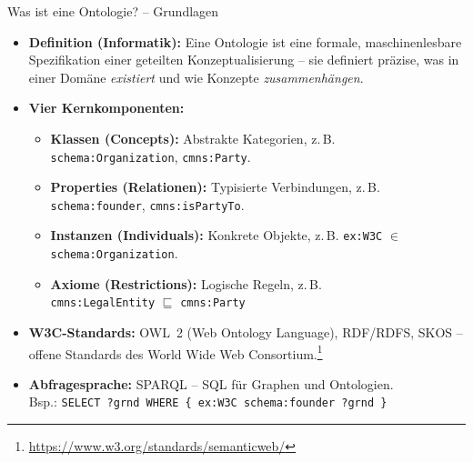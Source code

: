 \documentclass[aspectratio=1610, xcolor=dvipsnames, 9pt]{beamer}
\begin{document}
\begin{frame}{Was ist eine Ontologie? -- Grundlagen}
  \begin{itemize}
    \item \textbf{Definition (Informatik):} Eine Ontologie ist eine formale, maschinenlesbare Spezifikation einer geteilten Konzeptualisierung -- sie definiert präzise, was in einer Domäne \emph{existiert} und wie Konzepte \emph{zusammenhängen}.
    \item \textbf{Vier Kernkomponenten:}
      \begin{itemize}
        \item \textbf{Klassen (Concepts):} Abstrakte Kategorien, z.\,B. \texttt{schema:Organization}, \texttt{cmns:Party}.
        \item \textbf{Properties (Relationen):} Typisierte Verbindungen, z.\,B. \texttt{schema:founder}, \texttt{cmns:isPartyTo}.
        \item \textbf{Instanzen (Individuals):} Konkrete Objekte, z.\,B. \texttt{ex:W3C} $\in$ \texttt{schema:Organization}.
        \item \textbf{Axiome (Restrictions):} Logische Regeln, z.\,B.\\
          \texttt{cmns:LegalEntity} $\sqsubseteq$ \texttt{cmns:Party}
      \end{itemize}
    \item \textbf{W3C-Standards:} OWL~2 (Web Ontology Language), RDF/RDFS, SKOS -- offene Standards des World Wide Web Consortium.\footnote{\url{https://www.w3.org/standards/semanticweb/}}
    \item \textbf{Abfragesprache:} SPARQL -- SQL für Graphen und Ontologien.\\
      Bsp.: \texttt{SELECT ?grnd WHERE \{ ex:W3C schema:founder ?grnd \}}
  \end{itemize}
\end{frame}
\end{document}
